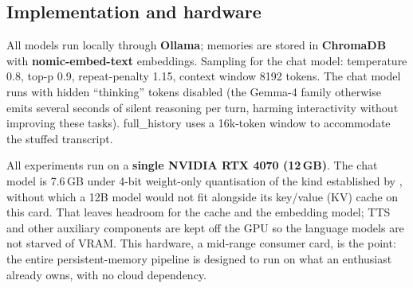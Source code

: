 \subsection{Implementation and hardware}
\label{sec:setup-hardware}

All models run locally through \textbf{Ollama}; memories are stored in \textbf{ChromaDB}
with \textbf{nomic-embed-text} embeddings. Sampling for the chat model: temperature
0.8, top-p 0.9, repeat-penalty 1.15, context window 8192 tokens. The chat model
runs with hidden ``thinking'' tokens disabled (the Gemma-4 family otherwise emits
several seconds of silent reasoning per turn, harming interactivity without
improving these tasks). full\_history uses a 16k-token window to accommodate the
stuffed transcript.

All experiments run on a \textbf{single NVIDIA RTX 4070 (12\,GB)}. The chat model is
7.6\,GB under 4-bit weight-only quantisation of the kind established by
\citet{lin2023awq}, without which a 12B model would not fit alongside its
key/value (KV) cache on this card. That leaves headroom for the cache and the
embedding model;
TTS and other auxiliary components are kept off the GPU so the language models
are not starved of VRAM. This hardware, a mid-range consumer card, is the point:
the entire persistent-memory pipeline is designed to run on what an enthusiast
already owns, with no cloud dependency.

